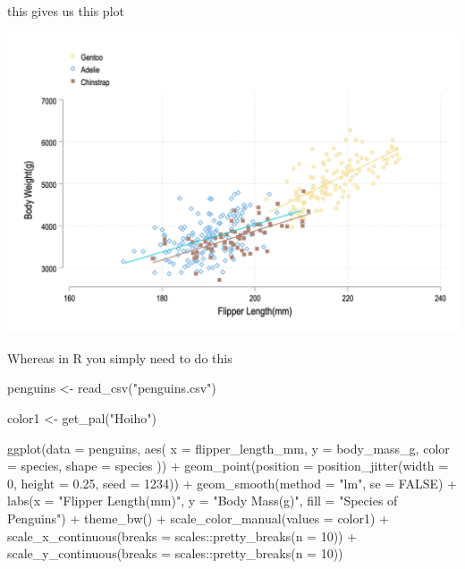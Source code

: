 \documentclass[]{tufte-handout}
\newenvironment{Shaded}{}{}
\newcommand{\AttributeTok}[1]{\textcolor[rgb]{0.49,0.56,0.16}{#1}}
\newcommand{\ConstantTok}[1]{\textcolor[rgb]{0.53,0.00,0.00}{#1}}
\newcommand{\DecValTok}[1]{\textcolor[rgb]{0.25,0.63,0.44}{#1}}
\newcommand{\FloatTok}[1]{\textcolor[rgb]{0.25,0.63,0.44}{#1}}
\newcommand{\FunctionTok}[1]{\textcolor[rgb]{0.02,0.16,0.49}{#1}}
\newcommand{\NormalTok}[1]{#1}
\newcommand{\OtherTok}[1]{\textcolor[rgb]{0.00,0.44,0.13}{#1}}
\newcommand{\SpecialCharTok}[1]{\textcolor[rgb]{0.25,0.44,0.63}{#1}}
\newcommand{\StringTok}[1]{\textcolor[rgb]{0.25,0.44,0.63}{#1}}
\begin{document}
this gives us this plot

\begin{center}\includegraphics[width=17.53in]{penguins-manu-example} \end{center}

Whereas in R you simply need to do this

\begin{Shaded}
\begin{Highlighting}[]
\NormalTok{penguins }\OtherTok{\textless{}{-}} \FunctionTok{read\_csv}\NormalTok{(}\StringTok{"penguins.csv"}\NormalTok{)}

\NormalTok{color1 }\OtherTok{\textless{}{-}} \FunctionTok{get\_pal}\NormalTok{(}\StringTok{"Hoiho"}\NormalTok{)}

\FunctionTok{ggplot}\NormalTok{(}\AttributeTok{data =}\NormalTok{ penguins, }\FunctionTok{aes}\NormalTok{(}
  \AttributeTok{x =}\NormalTok{ flipper\_length\_mm, }\AttributeTok{y =}\NormalTok{ body\_mass\_g, }\AttributeTok{color =}\NormalTok{ species,}
  \AttributeTok{shape =}\NormalTok{ species}
\NormalTok{)) }\SpecialCharTok{+}
  \FunctionTok{geom\_point}\NormalTok{(}\AttributeTok{position =} \FunctionTok{position\_jitter}\NormalTok{(}\AttributeTok{width =} \DecValTok{0}\NormalTok{, }\AttributeTok{height =} \FloatTok{0.25}\NormalTok{, }\AttributeTok{seed =} \DecValTok{1234}\NormalTok{)) }\SpecialCharTok{+}
  \FunctionTok{geom\_smooth}\NormalTok{(}\AttributeTok{method =} \StringTok{"lm"}\NormalTok{, }\AttributeTok{se =} \ConstantTok{FALSE}\NormalTok{) }\SpecialCharTok{+}
  \FunctionTok{labs}\NormalTok{(}\AttributeTok{x =} \StringTok{"Flipper Length(mm)"}\NormalTok{, }\AttributeTok{y =} \StringTok{"Body Mass(g)"}\NormalTok{, }\AttributeTok{fill =} \StringTok{"Species of Penguins"}\NormalTok{) }\SpecialCharTok{+}
  \FunctionTok{theme\_bw}\NormalTok{() }\SpecialCharTok{+}
  \FunctionTok{scale\_color\_manual}\NormalTok{(}\AttributeTok{values =}\NormalTok{ color1) }\SpecialCharTok{+}
  \FunctionTok{scale\_x\_continuous}\NormalTok{(}\AttributeTok{breaks =}\NormalTok{ scales}\SpecialCharTok{::}\FunctionTok{pretty\_breaks}\NormalTok{(}\AttributeTok{n =} \DecValTok{10}\NormalTok{)) }\SpecialCharTok{+}
  \FunctionTok{scale\_y\_continuous}\NormalTok{(}\AttributeTok{breaks =}\NormalTok{ scales}\SpecialCharTok{::}\FunctionTok{pretty\_breaks}\NormalTok{(}\AttributeTok{n =} \DecValTok{10}\NormalTok{))}
\end{Highlighting}
\end{Shaded}
\end{document}
